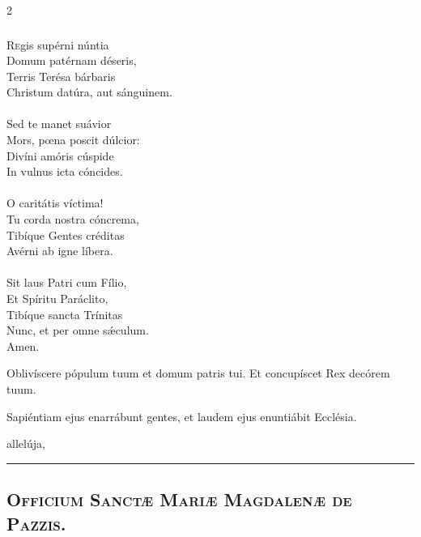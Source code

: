 \documentclass[9pt,twoside]{extarticle}
\begin{document}
\begin{multicols}{2}
\subsubsection*{\center {}}
\begin{center}\end{center}
\lettrine{R}egis supérni núntia\\
Domum patérnam déseris,\\
Terris Terésa bárbaris\\
Christum datúra, aut sánguinem.\\
\\
Sed te manet suávior\\
Mors, pœna poscit dúlcior:\\
Divíni amóris cúspide\\
In vulnus icta cóncides.\\
\\
O caritátis víctima!\\
Tu corda nostra cóncrema,\\
Tibíque Gentes créditas\\
Avérni ab igne líbera.\\
\\
Sit laus Patri cum Fílio,\\
Et Spíritu Paráclito,\\
Tibíque sancta Trínitas\\
Nunc, et per omne sǽculum.\\
Amen.

\begin{tightlist}{}
\item {} Oblivíscere pópulum tuum et domum patris tui.  Et concupíscet Rex decórem tuum.
\item {} Sapiéntiam ejus enarrábunt gentes, et laudem ejus enuntiábit Ecclésia.
\item {} allelúja, 
\end{tightlist}

\begin{center}\textcolor{red}{\rule{\linewidth}{0.5pt}} \end{center}

\subsection*{\center \textsc{Officium Sanctæ Mariæ Magdalenæ de Pazzis.}}

\end{multicols}
\end{document}
